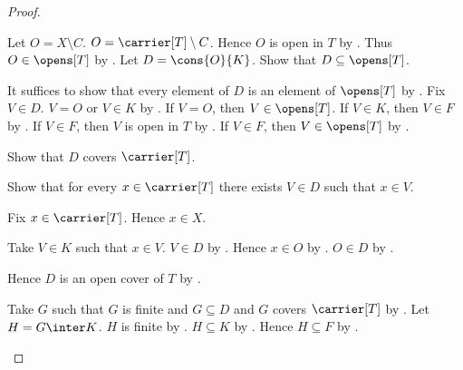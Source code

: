 \begin{proof}
\begin{subproof}
        Let $O=X\setminus C$.
        $O=\carrier[T]\setminus C$.
        Hence $O$ is open in $T$ by
            .
        Thus $O\in\opens[T]$ by .
        Let $D=\cons{O}{K}$.
        Show that $D\subseteq\opens[T]$.
        \begin{subproof}
            It suffices to show that every element of $D$ is an element
                of $\opens[T]$ by .
            Fix $V\in D$.
            $V=O$ or $V\in K$ by .
            If $V=O$, then $V\in\opens[T]$.
            If $V\in K$, then $V\in F$ by .
            If $V\in F$, then $V$ is open in $T$ by
                .
            If $V\in F$, then $V\in\opens[T]$ by .
        \end{subproof}
        Show that $D$ covers $\carrier[T]$.
        \begin{subproof}
            Show that for every $x\in\carrier[T]$ there exists $V\in D$
                such that $x\in V$.
            \begin{subproof}
                Fix $x\in\carrier[T]$.
                Hence $x\in X$.
                \begin{byCase}
                    Take $V\in K$ such that $x\in V$.
                    $V\in D$ by .
                    Hence $x\in O$ by .
                    $O\in D$ by .
                \end{byCase}
            \end{subproof}
        \end{subproof}
        Hence $D$ is an open cover of $T$ by .

        Take $G$ such that $G$ is finite and $G\subseteq D$ and
            $G$ covers $\carrier[T]$ by .
        Let $H=G\inter K$.
        $H$ is finite by .
        $H\subseteq K$ by .
        Hence $H\subseteq F$ by .


\end{subproof}
\end{proof}
